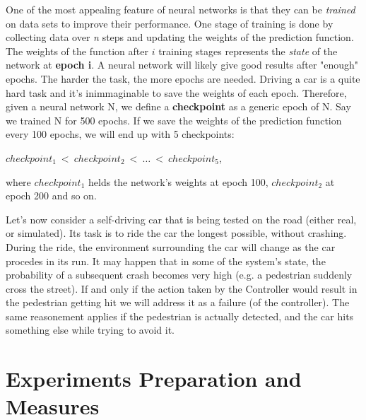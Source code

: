 One of the most appealing feature of neural networks is that they can be \textsl{trained} on data sets to improve their performance. One stage of training is done by collecting data over \textsl{n} steps and updating the weights of the prediction function. The weights of the function after $i$ training stages represents the \textsl{state} of the network at \textbf{epoch i}.\newline
A neural network will likely give good results after "enough" epochs. The harder the task, the more epochs are needed. Driving a car is a quite hard task and it's inimmaginable to save the weights of each epoch. Therefore, given a neural network N, we define a \textbf{checkpoint} as a generic epoch of N. Say we trained N for 500 epochs. If we save the weights of the prediction function every 100 epochs, we will end up with 5 checkpoints:

\begin{center}
	$checkpoint_{1}\: <\: checkpoint_{2}\: <\: \dots \:<\: checkpoint_{5}$,
\end{center}

where $checkpoint_{1}$ helds the network's weights at epoch 100, $checkpoint_{2}$ at epoch 200 and so on.\newline

Let's now consider a self-driving car that is being tested on the road (either real, or simulated). Its task is to ride the car the longest possible, without crashing. During the ride, the environment surrounding the car will change as the car procedes in its run. It may happen that in some of the system's state, the probability of a subsequent crash becomes very high (e.g. a pedestrian suddenly cross the street). If and only if the action taken by the Controller would result in the pedestrian getting hit we will address it as a failure (of the controller). The same reasonement applies if the pedestrian is actually detected, and the car hits something else while trying to avoid it.


\section{Experiments Preparation and Measures}

